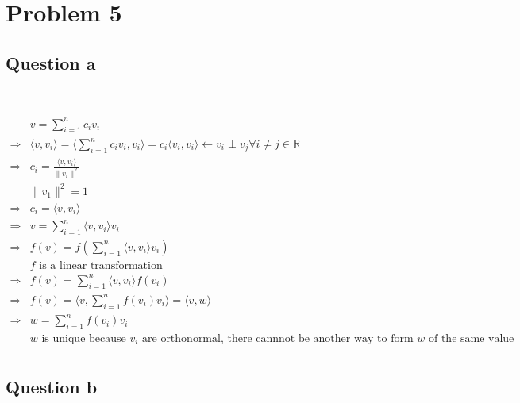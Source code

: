 \documentclass{article}
\def\R{\mathbb{R}}
\begin{document}
\newpage

\section{Problem 5}

\subsection{Question a}

~

\begin{equation*}
    \begin{split}
        &v=\sum^n_{i=1}c_iv_i\\
        \Rightarrow&\langle v,v_i\rangle=\langle\sum^n_{i=1}c_iv_i,v_i\rangle=c_i\langle v_i,v_i\rangle\leftarrow v_i\perp v_j\forall i\ne j\in \R\\
        \Rightarrow&c_i=\frac{\langle v,v_i\rangle}{\|v_i\|^2}\\
        &\|v_1\|^2=1\\
        \Rightarrow&c_i=\langle v,v_i\rangle\\
        \Rightarrow&v=\sum^n_{i=1}\langle v,v_i\rangle v_i\\
        \Rightarrow&f(v)=f(\sum^n_{i=1}\langle v,v_i\rangle v_i)\\
        &f\text{ is a linear transformation}\\
        \Rightarrow&f(v)=\sum^n_{i=1}\langle v,v_i\rangle f(v_i)\\
        \Rightarrow&f(v)=\langle v,\sum^n_{i=1}f(v_i)v_i\rangle=\langle v,w\rangle\\
        \Rightarrow&w=\sum^n_{i=1}f(v_i)v_i\\
        &w\text{ is unique because }v_i\text{ are orthonormal, there cannnot be another way to form }w\text{ of the same value}\\
    \end{split}
\end{equation*}

\subsection{Question b}

~
\end{document}
